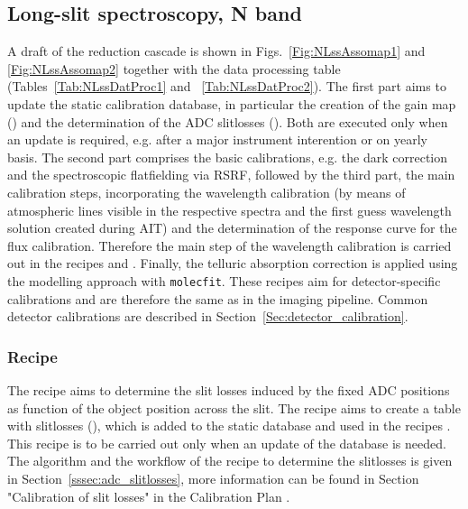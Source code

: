 \clearpage
\subsection{Long-slit spectroscopy, N band}
\label{ssec:recipes_lss_n}
A draft of the reduction cascade is shown in Figs.~\ref{Fig:NLssAssomap1} and \ref{Fig:NLssAssomap2} together with the data processing table (Tables~\ref{Tab:NLssDatProc1} and ~\ref{Tab:NLssDatProc2}). The first part aims to update the static calibration database, in particular the creation of the gain map (\hyperref[Sec:detector_calibration]{}) and the determination of the \ac{ADC} slitlosses (\hyperref[rec:metis_n_adc_slitloss]{}). Both are executed only when an update is required, e.g. after a major instrument interention or on yearly basis. The second part comprises the basic calibrations, e.g. the dark correction and the spectroscopic flatfielding via \ac{RSRF}, followed by the third part, the main calibration steps, incorporating the wavelength calibration (by means of atmospheric lines visible in the respective spectra and the first guess wavelength solution created during \ac{AIT}) and the determination of the response curve for the flux calibration. Therefore the main step of the wavelength calibration is carried out in the recipes \hyperref[rec:metis_n_lss_std]{} and \hyperref[rec:metis_lm_lss_sci]{}. Finally, the telluric absorption correction is applied using the modelling approach with \texttt{molecfit}.
These recipes aim for detector-specific calibrations and are therefore the same as in the imaging pipeline. Common detector calibrations are described in Section~\ref{Sec:detector_calibration}.
\subsubsection{Recipe }
The recipe \hyperref[sssec:adc_slitlosses]{} aims to determine the slit losses induced by the fixed \ac{ADC} positions as function of the object position across the slit. The recipe aims to create a table with slitlosses (\hyperref[dataitem:n_adc_slitloss]{}), which is added to the static database and used in the recipes \hyperref[rec:metis_n_lss_std]{}. This recipe is to be carried out only when an update of the database is needed. The algorithm and the workflow of the recipe to determine the slitlosses is given in Section~\ref{sssec:adc_slitlosses}, more information can be found in Section "Calibration of slit losses" in the Calibration Plan \cite{METIS-calibration_plan}. 

